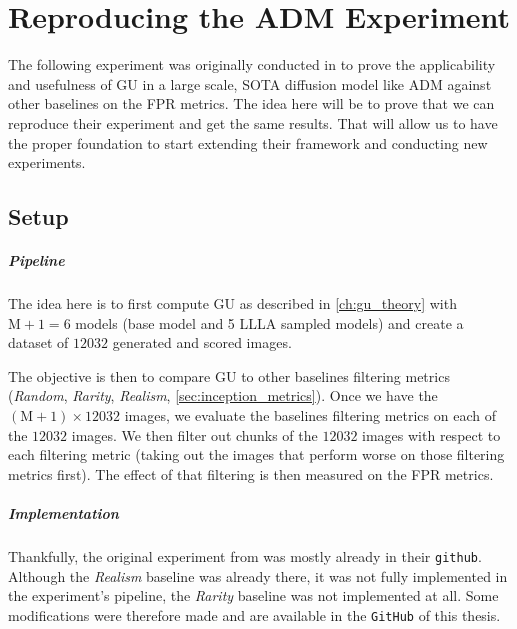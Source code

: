 \chapter{Reproducing the ADM Experiment}
\label{ch:reproduce_adm}

The following experiment was originally conducted in \cite{jazbec_generative_2025} to prove the applicability and usefulness of \acs{GU} in a large scale, \acs{SOTA} diffusion model like \acs{ADM} against other baselines on the \acs{FPR} metrics. The idea here will be to prove that we can reproduce their experiment and get the same results. That will allow us to have the proper foundation to start extending their framework and conducting new experiments.

\section{Setup}

\paragraph{Pipeline}
The idea here is to first compute \acs{GU} as described in \autoref{ch:gu_theory} with $\mathrm{M}+1=6$ models (base model and 5 \acs{LLLA} sampled models) and create a dataset of $12032$ generated and scored images. 


The objective is then to compare \acs{GU} to other baselines filtering metrics (\emph{Random}, \emph{Rarity}, \emph{Realism}, \autoref{sec:inception_metrics}).
Once we have the $(\mathrm{M}+1) \times 12032$ images, we evaluate the baselines filtering metrics on each of the $12032$ images. We then filter out chunks of the $12032$ images with respect to each filtering metric (taking out the images that perform worse on those filtering metrics first). The effect of that filtering is then measured on the \acs{FPR} metrics. 


\paragraph{Implementation}
Thankfully, the original experiment from \cite{jazbec_generative_2025} was mostly already in their \texttt{github}. Although the \emph{Realism} baseline was already there, it was not fully implemented in the experiment's pipeline, the \emph{Rarity} baseline was not implemented at all. Some modifications were therefore made and are available in the \texttt{GitHub} of this thesis.

